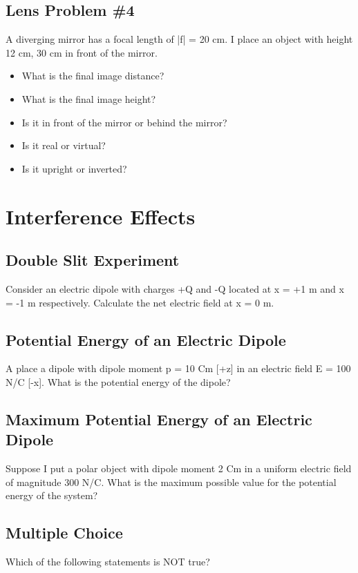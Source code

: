 \documentclass[11pt]{article}
\begin{document}
\subsection{Lens Problem \#4}
A diverging mirror has a focal length of |f| = 20 cm.  I place an object with height 12 cm, 30 cm in front of the mirror.  

\begin{itemize}
\item What is the final image distance?
\item What is the final image height?
\item Is it in front of the mirror or behind the mirror?  
\item Is it real or virtual?
\item Is it upright or inverted?
\end{itemize}





\pagebreak
\section{Interference Effects}

\subsection{Double Slit Experiment}
Consider an electric dipole with charges +Q and -Q located at x = +1 m and x = -1 m respectively.  Calculate the net electric field at x = 0 m.

\subsection{Potential Energy of an Electric Dipole}
A place a dipole with dipole moment p = 10 Cm [+z] in an electric field E = 100 N/C [-x].  What is the potential energy of the dipole?

\subsection{Maximum Potential Energy of an Electric Dipole}
Suppose I put a polar object with dipole moment 2 Cm in a uniform electric field of magnitude 300 N/C.  What is the maximum possible value for the potential energy of the system?

\subsection{Multiple Choice}
Which of the following statements is NOT true?
\end{document}
